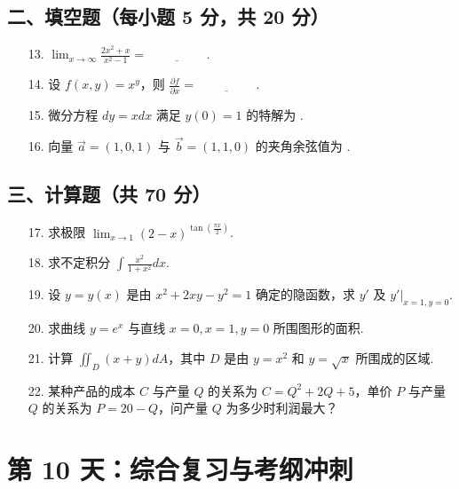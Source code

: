 \documentclass[11pt,a4paper]{article}
\begin{document}
\subsection*{二、填空题（每小题 5 分，共 20 分）}
\begin{enumerate}
    \item[13.] $\lim_{x \to \infty} \frac{2x^2+x}{x^2-1} = \underline{\hspace{2cm}}$.
    \item[14.] 设 $f(x,y) = x^y$，则 $\frac{\partial f}{\partial x} = \underline{\hspace{2cm}}$.
    \item[15.] 微分方程 $dy = x dx$ 满足 $y(0)=1$ 的特解为 \underline{\hspace{2cm}}.
    \item[16.] 向量 $\vec{a}=(1,0,1)$ 与 $\vec{b}=(1,1,0)$ 的夹角余弦值为 \underline{\hspace{2cm}}.
\end{enumerate}
\subsection*{三、计算题（共 70 分）}
\begin{enumerate}
    \item[17.] 求极限 $\lim_{x \to 1} (2-x)^{\tan(\frac{\pi x}{2})}$.
    \item[18.] 求不定积分 $\int \frac{x^2}{1+x^2} dx$.
    \item[19.] 设 $y = y(x)$ 是由 $x^2 + 2xy - y^2 = 1$ 确定的隐函数，求 $y'$ 及 $y'|_{x=1,y=0}$.
    \item[20.] 求曲线 $y = e^x$ 与直线 $x=0, x=1, y=0$ 所围图形的面积.
    \item[21.] 计算 $\iint_D (x+y) dA$，其中 $D$ 是由 $y=x^2$ 和 $y=\sqrt{x}$ 所围成的区域.
    \item[22.] 某种产品的成本 $C$ 与产量 $Q$ 的关系为 $C = Q^2 + 2Q + 5$，单价 $P$ 与产量 $Q$ 的关系为 $P = 20 - Q$，问产量 $Q$ 为多少时利润最大？
\end{enumerate}

\newpage

\section*{第 10 天：综合复习与考纲冲刺}
\end{document}
